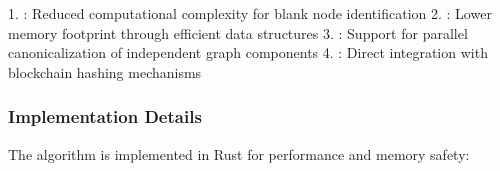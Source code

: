 \documentclass[letterpaper,10pt,english]{sphinxmanual}
\begin{document}
\begin{sphinxVerbatim}[commandchars=\\\{\}]
 
    

  
   
   
   
   
   
   
    
   
   
   
     
   
   
   
   
   
   
   
    
\end{sphinxVerbatim}

\sphinxAtStartPar
{}
1. : Reduced computational complexity for blank node identification
2. : Lower memory footprint through efficient data structures
3. : Support for parallel canonicalization of independent graph components
4. : Direct integration with blockchain hashing mechanisms


\subsubsection{Implementation Details}
\label{\detokenize{research/rdf-canonicalization-algorithm:implementation-details}}
\sphinxAtStartPar
The algorithm is implemented in Rust for performance and memory safety:
\end{document}
